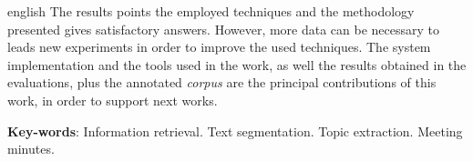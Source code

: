 \begin{resumo}[Abstract]
\begin{otherlanguage*}{english}
The results points the employed techniques and the methodology presented gives satisfactory answers. However, more data can be necessary to leads new experiments in order to improve the used techniques.  
The system implementation and the tools used in the work, as well the results obtained in the evaluations, plus the annotated \textit{corpus} are the principal contributions of this work, in order to support next works.








\textbf{Key-words}: 
Information retrieval.
Text segmentation.
Topic extraction.
Meeting minutes.

 \end{otherlanguage*}
\end{resumo}

